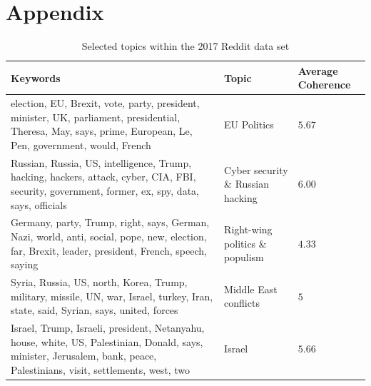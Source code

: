 \documentclass[final]{ieee}
\begin{document}
\newpage

\hbox{}


\newpage

\thispagestyle{empty}

\onecolumn

\section*{Appendix}

\begin{table}[htb]
\caption{Selected topics within the 2017 Reddit data set}
\begin{tabularx}{\textwidth}{X|l|l}
Keywords & Topic & Average Coherence \\ \hline
election, EU, Brexit, vote, party, president, minister, UK, parliament, presidential, Theresa, May, says, prime, European, Le, Pen, government, would, French & EU Politics & $5.67$ \\ \hline
Russian, Russia, US, intelligence, Trump, hacking, hackers, attack, cyber, CIA, FBI, security, government, former, ex, spy, data, says, officials & Cyber security \& Russian hacking & $6.00$ \\ \hline
Germany, party, Trump, right, says, German, Nazi, world, anti, social, pope, new, election, far, Brexit, leader, president, French, speech, saying & Right-wing politics \& populism & $4.33$ \\ \hline
Syria, Russia, US, north, Korea, Trump, military, missile, UN, war, Israel, turkey, Iran, state, said, Syrian, says, united, forces & Middle East conflicts & $5$ \\ \hline
Israel, Trump, Israeli, president, Netanyahu, house, white, US, Palestinian, Donald, says, minister, Jerusalem, bank, peace, Palestinians, visit, settlements, west, two & Israel & $5.66$ \\
\end{tabularx}
\label{tab:topics}
\end{table}
\end{document}
